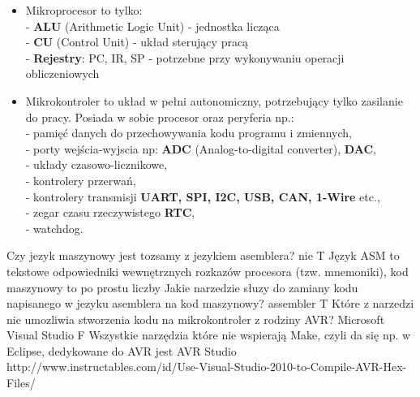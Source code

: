 	{\begin{itemize}
			\item Mikroprocesor to tylko:\\- \textbf{ALU} (Arithmetic Logic Unit) - jednostka licząca\\ - \textbf{CU} (Control Unit) - układ sterujący pracą\\ - \textbf{Rejestry}: PC, IR, SP - potrzebne przy wykonywaniu operacji obliczeniowych\\
			\item Mikrokontroler to układ w pełni autonomiczny, potrzebujący tylko zasilanie do pracy. Posiada w sobie procesor oraz peryferia np.:\\- pamięć danych do przechowywania kodu programu i zmiennych,\\- porty wejścia-wyjscia np: \textbf{ADC} (Analog-to-digital converter), \textbf{DAC},\\- układy czasowo-licznikowe, \\- kontrolery przerwań,\\- kontrolery transmisji\textbf{ UART, SPI, I2C, USB, CAN, 1-Wire} etc.,\\- zegar czasu rzeczywistego \textbf{RTC},\\- watchdog.
		\end{itemize}}
		\answer
		{Czy jezyk maszynowy jest tozsamy z jezykiem asemblera? }
		{nie}
		{T}
		{}
		{Język ASM to tekstowe odpowiedniki wewnętrznych rozkazów procesora (tzw. mnemoniki), kod maszynowy to po prostu liczby}
		\answer
		{Jakie narzedzie słuzy do zamiany kodu napisanego w jezyku asemblera na kod maszynowy? }
		{assembler}
		{T}
		{}
		{}
		\answer
		{Które z narzedzi nie umozliwia stworzenia kodu na mikrokontroler z rodziny AVR?}
		{Microsoft Visual Studio
		}
		{F}
		{Wszystkie narzędzia które nie wspierają Make, czyli da się np. w Eclipse, dedykowane do AVR jest AVR Studio}
		{http://www.instructables.com/id/Use-Visual-Studio-2010-to-Compile-AVR-Hex-Files/}
